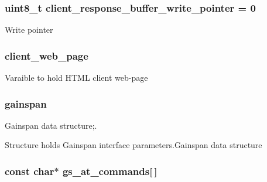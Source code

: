 \subsubsection[{\texorpdfstring{client\+\_\+response\+\_\+buffer\+\_\+write\+\_\+pointer}{client_response_buffer_write_pointer}}]{\setlength{\rightskip}{0pt plus 5cm}uint8\+\_\+t client\+\_\+response\+\_\+buffer\+\_\+write\+\_\+pointer = 0}\hypertarget{group__wireless__interface_ga3b5ad9fbc3f1f6ef9340e180a86d75c0}{}\label{group__wireless__interface_ga3b5ad9fbc3f1f6ef9340e180a86d75c0}
Write pointer 
\subsubsection[{\texorpdfstring{client\+\_\+web\+\_\+page}{client_web_page}}]{ client\+\_\+web\+\_\+page}\hypertarget{group__wireless__interface_ga89c8d1fbc038a4f41cb713ec8b7fcd23}{}\label{group__wireless__interface_ga89c8d1fbc038a4f41cb713ec8b7fcd23}
Varaible to hold H\+T\+ML client web-\/page 
\subsubsection[{\texorpdfstring{gainspan}{gainspan}}]{ gainspan}\hypertarget{group__wireless__interface_ga6ca64d92ac8c97336c5b12c1c7bd314c}{}\label{group__wireless__interface_ga6ca64d92ac8c97336c5b12c1c7bd314c}


Gainspan data structure;. 

Structure holds Gainspan interface parameters.\+Gainspan data structure 
\subsubsection[{\texorpdfstring{gs\+\_\+at\+\_\+commands}{gs_at_commands}}]{\setlength{\rightskip}{0pt plus 5cm}const char$\ast$ gs\+\_\+at\+\_\+commands\mbox{[}$\,$\mbox{]}}\hypertarget{group__wireless__interface_gac38a44d54dfb9bc52a44c22fc1cb0599}{}\label{group__wireless__interface_gac38a44d54dfb9bc52a44c22fc1cb0599}


